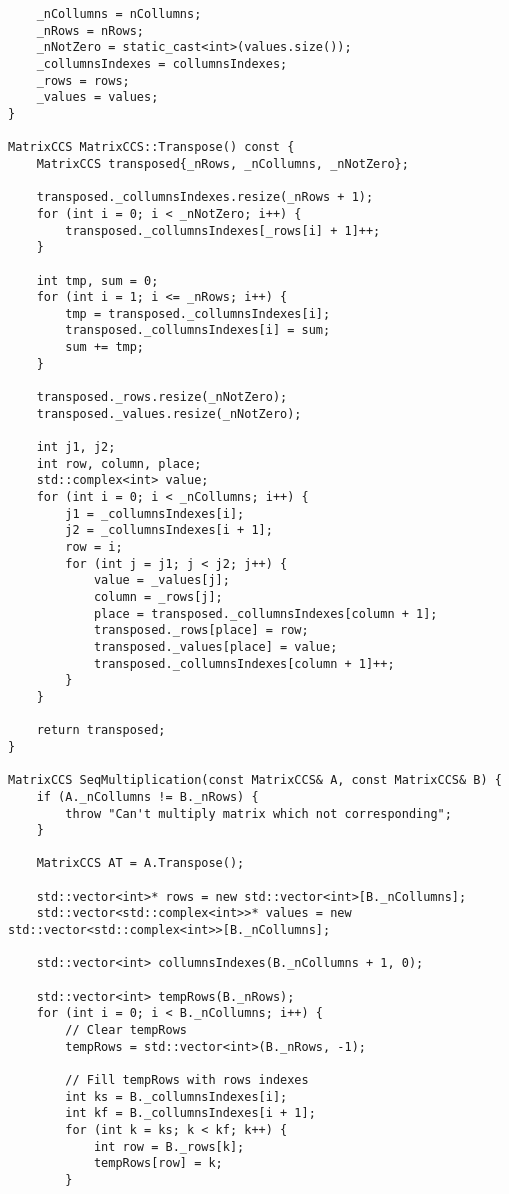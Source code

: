 \documentclass{report}
\begin{document}
\begin{lstlisting}
    _nCollumns = nCollumns;
    _nRows = nRows;
    _nNotZero = static_cast<int>(values.size());
    _collumnsIndexes = collumnsIndexes;
    _rows = rows;
    _values = values;
}

MatrixCCS MatrixCCS::Transpose() const {
    MatrixCCS transposed{_nRows, _nCollumns, _nNotZero};

    transposed._collumnsIndexes.resize(_nRows + 1);
    for (int i = 0; i < _nNotZero; i++) {
        transposed._collumnsIndexes[_rows[i] + 1]++;
    }

    int tmp, sum = 0;
    for (int i = 1; i <= _nRows; i++) {
        tmp = transposed._collumnsIndexes[i];
        transposed._collumnsIndexes[i] = sum;
        sum += tmp;
    }

    transposed._rows.resize(_nNotZero);
    transposed._values.resize(_nNotZero);

    int j1, j2;
    int row, column, place;
    std::complex<int> value;
    for (int i = 0; i < _nCollumns; i++) {
        j1 = _collumnsIndexes[i];
        j2 = _collumnsIndexes[i + 1];
        row = i;
        for (int j = j1; j < j2; j++) {
            value = _values[j];
            column = _rows[j];
            place = transposed._collumnsIndexes[column + 1];
            transposed._rows[place] = row;
            transposed._values[place] = value;
            transposed._collumnsIndexes[column + 1]++;
        }
    }

    return transposed;
}

MatrixCCS SeqMultiplication(const MatrixCCS& A, const MatrixCCS& B) {
    if (A._nCollumns != B._nRows) {
        throw "Can't multiply matrix which not corresponding";
    }

    MatrixCCS AT = A.Transpose();

    std::vector<int>* rows = new std::vector<int>[B._nCollumns];
    std::vector<std::complex<int>>* values = new std::vector<std::complex<int>>[B._nCollumns];

    std::vector<int> collumnsIndexes(B._nCollumns + 1, 0);

    std::vector<int> tempRows(B._nRows);
    for (int i = 0; i < B._nCollumns; i++) {
        // Clear tempRows
        tempRows = std::vector<int>(B._nRows, -1);

        // Fill tempRows with rows indexes
        int ks = B._collumnsIndexes[i];
        int kf = B._collumnsIndexes[i + 1];
        for (int k = ks; k < kf; k++) {
            int row = B._rows[k];
            tempRows[row] = k;
        }


\end{lstlisting}
\end{document}
